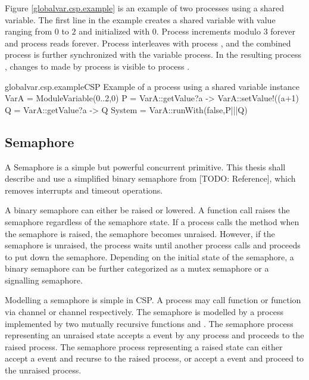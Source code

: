 \documentclass{article}
\begin{document}
Figure \ref{globalvar.csp.example} is an example of two processes using a shared variable. The first line in the example creates a shared variable  with value ranging from $0$ to $2$ and initialized with $0$. Process  increments  modulo $3$ forever and process  reads  forever. Process  interleaves with process , and the combined process is further synchronized with the variable  process. In the resulting process , changes to  made by process  is visible to process .

\begin{cspinline}{globalvar.csp.example}{CSP Example of a process using a shared variable}
instance VarA = ModuleVariable({0..2},0)
P = VarA::getValue?a -> VarA::setValue!((a+1)%
Q = VarA::getValue?a -> Q
System = VarA::runWith(false,P|||Q)
\end{cspinline}


\subsection{Semaphore}
A Semaphore is a simple but powerful concurrent primitive. This thesis shall describe and use a simplified binary semaphore from [TODO: Reference], which removes interrupts and timeout operations. 

A binary semaphore can either be raised or lowered. A  function call raises the semaphore regardless of the semaphore state. If a process calls the  method when the semaphore is raised, the semaphore becomes unraised. However, if the semaphore is unraised, the process waits until another process calls  and proceeds to put down the semaphore. Depending on the initial state of the semaphore, a binary semaphore can be further categorized as a mutex semaphore or a signalling semaphore.

Modelling a semaphore is simple in CSP. A process may call  function or  function via channel  or channel  respectively. The semaphore is modelled by a process implemented by two mutually recursive functions  and . The semaphore process representing an unraised state accepts a  event by any process and proceeds to the raised process. The semaphore process representing a raised state can either accept a  event and recurse to the raised process, or accept a  event and proceed to the unraised process.
\end{document}
